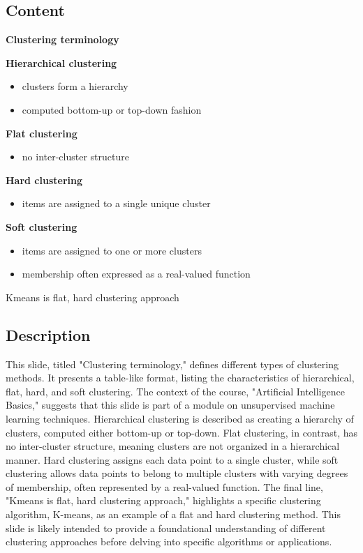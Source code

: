 \documentclass{article}%
\begin{document}
\subsection{Content}%

\textbf{Clustering terminology}

\textbf{Hierarchical clustering}
\begin{itemize}
    \item clusters form a hierarchy
    \item computed bottom-up or top-down fashion
\end{itemize}

\textbf{Flat clustering}
\begin{itemize}
    \item no inter-cluster structure
\end{itemize}

\textbf{Hard clustering}
\begin{itemize}
    \item items are assigned to a single unique cluster
\end{itemize}

\textbf{Soft clustering}
\begin{itemize}
    \item items are assigned to one or more clusters
    \item membership often expressed as a real-valued function
\end{itemize}

Kmeans is flat, hard clustering approach
%
\subsection{Description}%
This slide, titled "Clustering terminology," defines different types of clustering methods.  It presents a table-like format, listing the characteristics of hierarchical, flat, hard, and soft clustering.  The context of the course, "Artificial Intelligence Basics," suggests that this slide is part of a module on unsupervised machine learning techniques.  Hierarchical clustering is described as creating a hierarchy of clusters, computed either bottom-up or top-down.  Flat clustering, in contrast, has no inter-cluster structure, meaning clusters are not organized in a hierarchical manner.  Hard clustering assigns each data point to a single cluster, while soft clustering allows data points to belong to multiple clusters with varying degrees of membership, often represented by a real-valued function.  The final line, "Kmeans is flat, hard clustering approach," highlights a specific clustering algorithm, K-means, as an example of a flat and hard clustering method.  This slide is likely intended to provide a foundational understanding of different clustering approaches before delving into specific algorithms or applications.%
\end{document}
